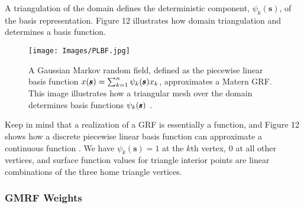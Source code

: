 A triangulation of the domain defines the deterministic component, $\psi_{k}(\pmb{s})$, of the basis representation. Figure 12 \citep{Simpson2012} illustrates how domain triangulation and determines a basis function.

  \begin{figure}[H]
	\centering 
	\texttt{[image: Images/PLBF.jpg]}
	\caption{A Gaussian Markov random field, defined as the piecewise linear basis function $  x(\pmb{s}) = \sum_{k=1}^{n} \protect\psi_{k}(\pmb{s})x_{k}$, approximates a Matern GRF. This image illustrates how a triangular mesh over the domain determines basis functions $\protect\psi_{k}(\pmb{s})$ 
	\citep{Simpson2012}.}
	\end{figure}
	
Keep in mind that a realization of a GRF is essentially a function, and Figure 12 shows how a discrete piecewise linear basis function can approximate a continuous function \citep{Simpson2012}. We have $\psi_{k}(\pmb{s}) = 1$ at the $k\text{th}$ vertex, $0$ at all other vertices, and surface function values for triangle interior points are linear combinations of the three home triangle vertices.

\subsubsection{GMRF Weights}

